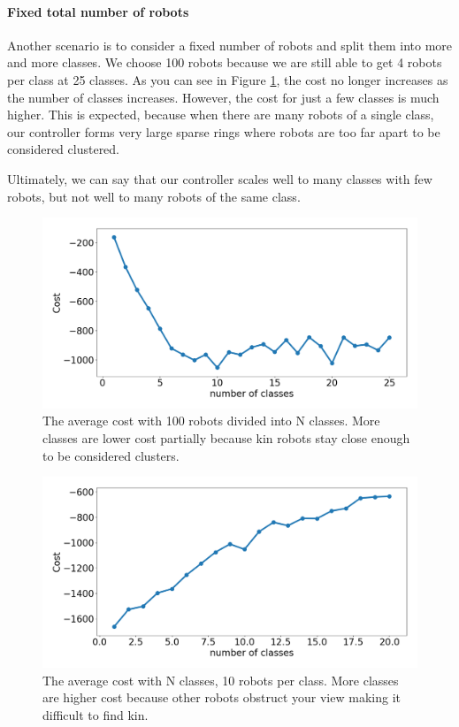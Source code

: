 \documentclass[conference]{IEEEtran}
\begin{document}
    \paragraph{Fixed total number of robots}

    Another scenario is to consider a fixed number of robots and split them into more and more classes. We choose 100 robots because we are still able to get 4 robots per class at 25 classes. As you can see in Figure \ref{fig:num_classes_100}, the cost no longer increases as the number of classes increases. However, the cost for just a few classes is much higher. This is expected, because when there are many robots of a single class, our controller forms very large sparse rings where robots are too far apart to be considered clustered.

    Ultimately, we can say that our controller scales well to many classes with few robots, but not well to many robots of the same class.

    \begin{figure}[H]
      \centering
      \includegraphics[width=1\linewidth]{./images/num_classes_vs_cost_100_robots.png}
      \caption{The average cost with 100 robots divided into N classes. More classes are lower cost partially because kin robots stay close enough to be considered clusters.}
      \label{fig:num_classes_100}
    \end{figure}

    \begin{figure}[H]
      \centering
      \includegraphics[width=1\linewidth]{./images/num_classes_vs_cost_10_per_class.png}
      \caption{The average cost with N classes, 10 robots per class. More classes are higher cost because other robots obstruct your view making it difficult to find kin.}
      \label{fig:num_classes_10}
    \end{figure}
\end{document}
